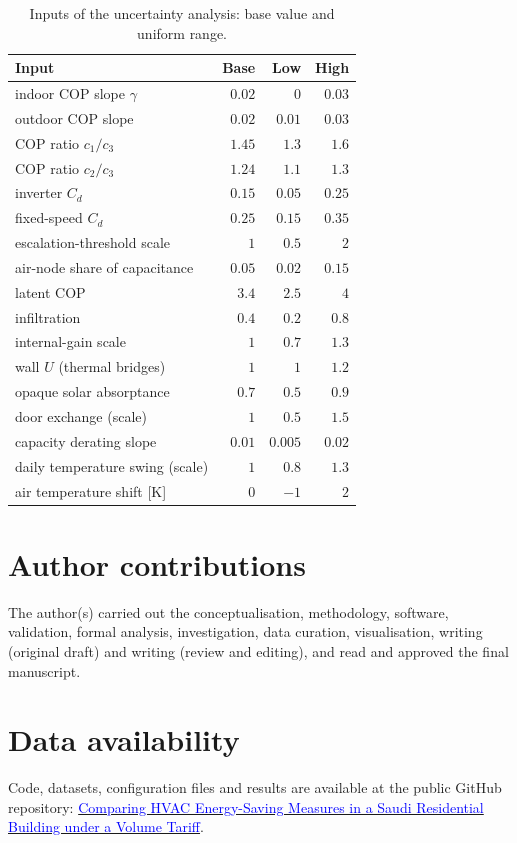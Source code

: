 \documentclass[10pt,a4paper,twocolumn]{article}
\theoremstyle{definition}
\begin{document}
\begin{table}[t]
\centering\footnotesize
\caption{Inputs of the uncertainty analysis: base value and uniform range.}\label{S:tab:uqpar}
\begin{tabularx}{\linewidth}{@{}X r r r@{}}
\toprule
Input & Base & Low & High \\
\midrule
indoor COP slope $\gamma$ & $0.02$ & $0$ & $0.03$ \\
outdoor COP slope & $0.02$ & $0.01$ & $0.03$ \\
COP ratio $c_1/c_3$ & $1.45$ & $1.3$ & $1.6$ \\
COP ratio $c_2/c_3$ & $1.24$ & $1.1$ & $1.3$ \\
inverter $C_d$ & $0.15$ & $0.05$ & $0.25$ \\
fixed-speed $C_d$ & $0.25$ & $0.15$ & $0.35$ \\
escalation-threshold scale & $1$ & $0.5$ & $2$ \\
air-node share of capacitance & $0.05$ & $0.02$ & $0.15$ \\
latent COP & $3.4$ & $2.5$ & $4$ \\
infiltration & $0.4$ & $0.2$ & $0.8$ \\
internal-gain scale & $1$ & $0.7$ & $1.3$ \\
wall $U$ (thermal bridges) & $1$ & $1$ & $1.2$ \\
opaque solar absorptance & $0.7$ & $0.5$ & $0.9$ \\
door exchange (scale) & $1$ & $0.5$ & $1.5$ \\
capacity derating slope & $0.01$ & $0.005$ & $0.02$ \\
daily temperature swing (scale) & $1$ & $0.8$ & $1.3$ \\
air temperature shift [K] & $0$ & $-1$ & $2$ \\
\bottomrule
\end{tabularx}
\end{table}


\section*{Author contributions}

The author(s) carried out the conceptualisation, methodology, software, validation, formal analysis, investigation, data curation, visualisation, writing (original draft) and writing (review and editing), and read and approved the final manuscript.


\section*{Data availability}
Code, datasets, configuration files and results are 
available at the public GitHub repository: \href{https://github.com/drhamzahfaraj/Comparing-HVAC-Energy-Saving-Measures-in-a-Saudi-Residential-Building-under-a-Volume-Tarif}{\textcolor{blue}{Comparing HVAC Energy-Saving Measures in a Saudi Residential Building under a Volume Tariff}}.
\end{document}
